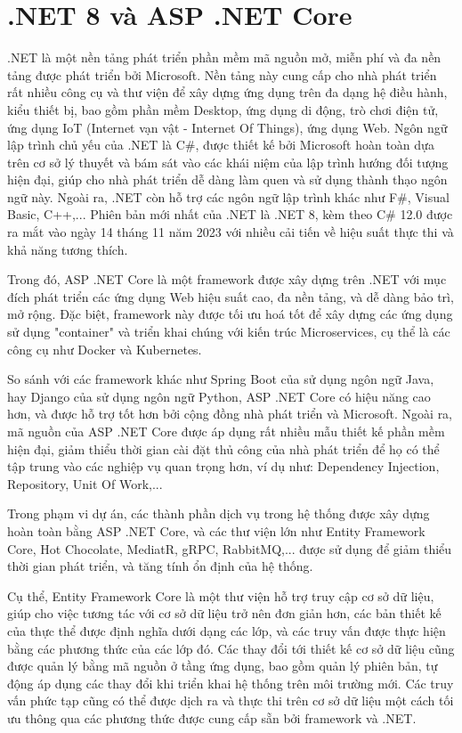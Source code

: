 \documentclass[../DoAn.tex]{subfiles}
\begin{document}
\section{.NET 8 và ASP .NET Core}
\label{section:3.3}

.NET là một nền tảng phát triển phần mềm mã nguồn mở, miễn phí và đa nền tảng được phát triển bởi Microsoft. Nền tảng này cung cấp cho nhà phát triển
rất nhiều công cụ và thư viện để xây dựng ứng dụng trên đa dạng hệ điều hành, kiểu thiết bị, bao gồm phần mềm Desktop, ứng dụng di động, trò chơi điện tử,
ứng dụng IoT (Internet vạn vật - Internet Of Things), ứng dụng Web. Ngôn ngữ lập trình chủ yếu của .NET là C\#, được thiết kế bởi Microsoft hoàn toàn dựa trên
cơ sở lý thuyết và bám sát vào các khái niệm của lập trình hướng đối tượng hiện đại, giúp cho nhà phát triển dễ dàng làm quen và sử dụng thành thạo
ngôn ngữ này. Ngoài ra, .NET còn hỗ trợ các ngôn ngữ lập trình khác như F\#, Visual Basic, C++,... Phiên bản mới nhất của .NET là .NET 8, kèm theo
C\# 12.0 được ra mắt vào ngày 14 tháng 11 năm 2023 với nhiều cải tiến về hiệu suất thực thi và khả năng tương thích.\cite{DotNetMS}

Trong đó, ASP .NET Core là một framework được xây dựng  trên .NET với mục đích phát triển các ứng dụng Web hiệu suất cao, đa nền tảng,
và dễ dàng bảo trì, mở rộng. Đặc biệt, framework này được tối ưu hoá tốt để xây dựng các ứng dụng sử dụng "container" và triển khai chúng với
kiến trúc Microservices, cụ thể là các công cụ như Docker và Kubernetes.\cite{DotNetMS}

So sánh với các framework khác như Spring Boot của sử dụng ngôn ngữ Java, hay Django của sử dụng ngôn ngữ Python, ASP .NET Core có hiệu năng cao hơn,
và được hỗ trợ tốt hơn bởi cộng đồng nhà phát triển và Microsoft. Ngoài ra, mã nguồn của ASP .NET Core được áp dụng rất nhiều mẫu thiết kế phần mềm
hiện đại, giảm thiểu thời gian cài đặt thủ công của nhà phát triển để họ có thể tập trung vào các nghiệp vụ quan trọng hơn, ví dụ như:
Dependency Injection, Repository, Unit Of Work,...

Trong phạm vi dự án, các thành phần dịch vụ trong hệ thống được xây dựng hoàn toàn bằng ASP .NET Core, và các thư viện lớn như Entity Framework Core,
Hot Chocolate, MediatR, gRPC, RabbitMQ,... được sử dụng để giảm thiểu thời gian phát triển, và tăng tính ổn định của hệ thống.

Cụ thể, Entity Framework Core là một thư viện hỗ trợ truy cập cơ sở dữ liệu, giúp cho việc tương tác với cơ sở dữ liệu trở nên đơn giản hơn,
các bản thiết kế của thực thể được định nghĩa dưới dạng các lớp, và các truy vấn được thực hiện bằng các phương thức của các lớp đó. Các thay đổi
tới thiết kế cơ sở dữ liệu cũng được quản lý bằng mã nguồn ở tầng ứng dụng, bao gồm quản lý phiên bản, tự động áp dụng các thay đổi khi triển
khai hệ thống trên môi trường mới. Các truy vấn phức tạp cũng có thể được dịch ra và thực thi trên cơ sở dữ liệu một cách tối ưu thông qua các phương
thức được cung cấp sẵn bởi framework và .NET.
\end{document}
